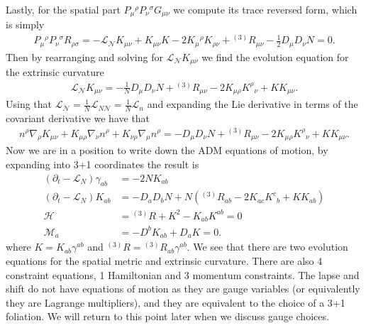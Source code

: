 \documentclass[10pt]{report}
\theoremstyle{definition}
\newcommand{\N}[0]{\mathcal{N}}
\begin{document}
Lastly, for the spatial part $P_\mu{}^\rho P_\nu{}^\sigma G_{\mu\nu}$ we compute its trace reversed form, which is simply 
\begin{align}
    P_\mu{}^\rho P_\nu{}^\sigma R_{\rho\sigma} = - \mathcal{L}_\N K_{\mu\nu} + K_{\mu\nu} K - 2 K_\mu{}^\rho K_{\rho\nu} + {}^{(3)} R_{\mu\nu} - \frac{1}{2} D_{\mu} D_{\nu} N = 0.
\end{align}
Then by rearranging and solving for $\mathcal{L}_{\N} K_{\mu\nu}$ we find the evolution equation for the extrinsic curvature 
\begin{align}
    \mathcal{L}_{\N} K_{\mu\nu} = - \frac{1}{N} D_\mu D_\nu N + {}^{(3)} R_{\mu\nu}  - 2 K_{\mu\rho} K^\rho{}_\nu + K K_{\mu\nu}.
\end{align}
Using that $\mathcal{L}_{\N} = \frac{1}{N} \mathcal{L}_{N \N} = \frac{1}{N} \mathcal{L}_{n}$ and expanding the Lie derivative in terms of the covariant derivative we have that 
\begin{align}
    n^\rho \nabla_\rho K_{\mu\nu} + K_{\mu\rho} \nabla_\nu n^\rho + K_{\nu\rho} \nabla_\mu n^\rho = - D_\mu D_\nu N + {}^{(3)} R_{\mu\nu}  - 2 K_{\mu\rho} K^\rho{}_\nu + K K_{\mu\nu}.
\end{align}
Now we are in a position to write down the ADM equations of motion, by expanding into 3+1 coordinates the result is
\begin{align}
    \left( \partial_t - \mathcal{L}_{N} \right) \gamma_{ab} &= -2 N K_{ab} \\
    \left( \partial_t - \mathcal{L}_{N} \right) K_{ab} &= - D_a D_b N + N \left( {}^{(3)} R_{ab} - 2 K_{ac} K^c{}_b + K K_{ab} \right) \\[10pt]
    \mathcal{H} & = {}^{(3)} R + K^2 - K_{ab} K^{ab} = 0 \label{eq:num-metric-hamiltonian-constraint} \\
    \mathcal{M}_a & = - D^b K_{ab} + D_a K = 0. \label{eq:num-metric-momentum-constraint}
\end{align}
where $K = K_{ab} \gamma^{ab}$ and ${}^{(3)} R = {}^{(3)} R_{ab} \gamma^{ab}$. We see that there are two evolution equations for the spatial metric and extrinsic curvature. There are also 4 constraint equations, 1 Hamiltonian and 3 momentum constraints. The lapse and shift do not have equations of motion as they are gauge variables (or equivalently they are Lagrange multipliers), and they are equivalent to the choice of a 3+1 foliation. We will return to this point later when we discuss gauge choices.
\end{document}
